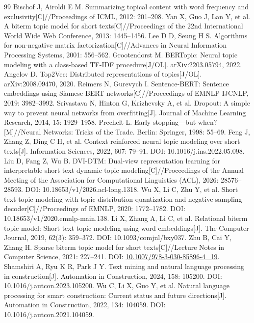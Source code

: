 \documentclass[11pt]{article}
\begin{document}
\begin{thebibliography}{99}
 Bischof J, Airoldi E M. Summarizing topical content with word frequency and exclusivity[C]//Proceedings of ICML, 2012: 201--208.
 Yan X, Guo J, Lan Y, et al. A biterm topic model for short texts[C]//Proceedings of the 22nd International World Wide Web Conference, 2013: 1445--1456.
 Lee D D, Seung H S. Algorithms for non-negative matrix factorization[C]//Advances in Neural Information Processing Systems, 2001: 556--562.
 Grootendorst M. BERTopic: Neural topic modeling with a class-based TF-IDF procedure[J/OL]. arXiv:2203.05794, 2022.
 Angelov D. Top2Vec: Distributed representations of topics[J/OL]. arXiv:2008.09470, 2020.
 Reimers N, Gurevych I. Sentence-BERT: Sentence embeddings using Siamese BERT-networks[C]//Proceedings of EMNLP-IJCNLP, 2019: 3982--3992.
 Srivastava N, Hinton G, Krizhevsky A, et al. Dropout: A simple way to prevent neural networks from overfitting[J]. Journal of Machine Learning Research, 2014, 15: 1929--1958.
 Prechelt L. Early stopping---but when?[M]//Neural Networks: Tricks of the Trade. Berlin: Springer, 1998: 55--69.
 Feng J, Zhang Z, Ding C H, et al. Context reinforced neural topic modeling over short texts[J]. Information Sciences, 2022, 607: 79--91. DOI: 10.1016/j.ins.2022.05.098.
 Liu D, Fang Z, Wu B. DVI-DTM: Dual-view representation learning for interpretable short text dynamic topic modeling[C]//Proceedings of the Annual Meeting of the Association for Computational Linguistics (ACL), 2026: 28576--28593. DOI: 10.18653/v1/2026.acl-long.1318.
 Wu X, Li C, Zhu Y, et al. Short text topic modeling with topic distribution quantization and negative sampling decoder[C]//Proceedings of EMNLP, 2020: 1772--1782. DOI: 10.18653/v1/2020.emnlp-main.138.
 Li X, Zhang A, Li C, et al. Relational biterm topic model: Short-text topic modeling using word embeddings[J]. The Computer Journal, 2019, 62(3): 359--372. DOI: 10.1093/comjnl/bxy037.
 Zhu B, Cai Y, Zhang H. Sparse biterm topic model for short texts[C]//Lecture Notes in Computer Science, 2021: 227--241. DOI: \url{10.1007/978-3-030-85896-4_19}.
 Shamshiri A, Ryu K R, Park J Y. Text mining and natural language processing in construction[J]. Automation in Construction, 2024, 158: 105200. DOI: 10.1016/j.autcon.2023.105200.
 Wu C, Li X, Guo Y, et al. Natural language processing for smart construction: Current status and future directions[J]. Automation in Construction, 2022, 134: 104059. DOI: 10.1016/j.autcon.2021.104059.

\end{thebibliography}
\end{document}
